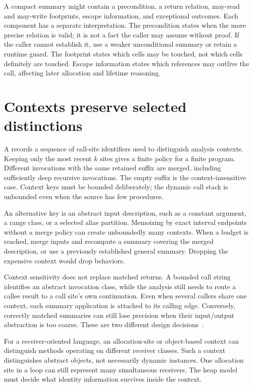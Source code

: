 A compact summary might contain a precondition, a return relation, may-read and may-write footprints, escape information, and exceptional outcomes.
Each component has a separate interpretation.
The precondition states when the more precise relation is valid; it is not a fact the caller may assume without proof.
If the caller cannot establish it, use a weaker unconditional summary or retain a runtime guard.
The footprint states which cells may be touched, not which cells definitely are touched.
Escape information states which references may outlive the call, affecting later allocation and lifetime reasoning.

\section{Contexts preserve selected distinctions}
\label{sec:ch44-contexts}

A  records a sequence of call-site identifiers used to distinguish analysis contexts.
Keeping only the most recent $k$ sites gives a finite policy for a finite program.
Different invocations with the same retained suffix are merged, including sufficiently deep recursive invocations.
The empty suffix is the context-insensitive case.
Context keys must be bounded deliberately; the dynamic call stack is unbounded even when the source has few procedures.

An alternative key is an abstract input description, such as a constant argument, a range class, or a selected alias partition.
Memoizing by exact interval endpoints without a merge policy can create unboundedly many contexts.
When a budget is reached, merge inputs and recompute a summary covering the merged description, or use a previously established general summary.
Dropping the expensive context would drop behaviors.

Context sensitivity does not replace matched returns.
A bounded call string identifies an abstract invocation class, while the analysis still needs to route a callee result to a call site's own continuation.
Even when several callers share one context, each summary application is attached to its calling edge.
Conversely, correctly matched summaries can still lose precision when their input/output abstraction is too coarse.
These are two different design decisions~\cite{nielson-1999-principles}.

For a receiver-oriented language, an allocation-site or object-based context can distinguish methods operating on different receiver classes.
Such a context distinguishes abstract objects, not necessarily dynamic instances.
One allocation site in a loop can still represent many simultaneous receivers.
The heap model must decide what identity information survives inside the context.


